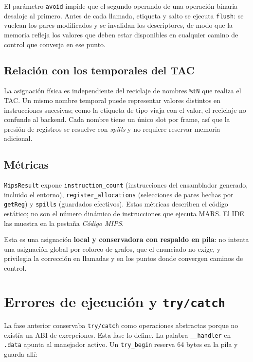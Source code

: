 \documentclass[11pt,a4paper]{article}
\begin{document}
El parámetro \texttt{avoid} impide que el segundo operando de una operación
binaria desaloje al primero. Antes de cada llamada, etiqueta y salto se ejecuta
\texttt{flush}: se vuelcan los pares modificados y se invalidan los
descriptores, de modo que la memoria refleja los valores que deben estar
disponibles en cualquier camino de control que converja en ese punto.

\subsection{Relación con los temporales del TAC}

La asignación física es independiente del reciclaje de nombres \texttt{\%tN} que
realiza el TAC. Un mismo nombre temporal puede representar valores distintos en
instrucciones sucesivas; como la etiqueta de tipo viaja con el valor, el
reciclaje no confunde al backend. Cada nombre tiene un único slot por frame, así
que la presión de registros se resuelve con \emph{spills} y no requiere
reservar memoria adicional.

\subsection{Métricas}

\texttt{MipsResult} expone \texttt{instruction\_count} (instrucciones del
ensamblador generado, incluido el entorno), \texttt{register\_allocations}
(selecciones de pares hechas por \texttt{getReg}) y \texttt{spills} (guardados
efectivos). Estas métricas describen el código estático; no son el número
dinámico de instrucciones que ejecuta MARS. El IDE las muestra en la pestaña
\emph{Código MIPS}.

Esta es una asignación \textbf{local y conservadora con respaldo en pila}: no
intenta una asignación global por coloreo de grafos, que el enunciado no exige,
y privilegia la corrección en llamadas y en los puntos donde convergen caminos
de control.

\section{Errores de ejecución y \texttt{try/catch}}

La fase anterior conservaba \texttt{try/catch} como operaciones abstractas
porque no existía un ABI de excepciones. Esta fase lo define. La palabra
\texttt{\_\_handler} en \texttt{.data} apunta al manejador activo. Un
\texttt{try\_begin} reserva 64 bytes en la pila y guarda allí:
\end{document}
